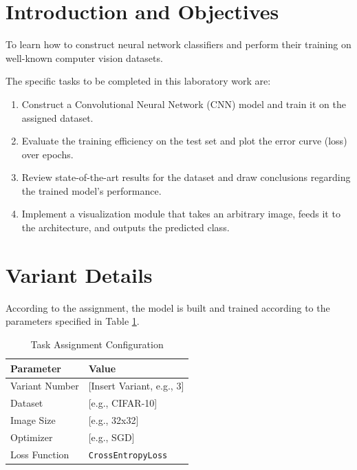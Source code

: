 \documentclass[12pt, a4paper]{article}
\begin{document}
\tableofcontents
\newpage


\section{Introduction and Objectives}

\begin{tcolorbox}[title=Laboratory Goal]
To learn how to construct neural network classifiers and perform their training on well-known computer vision datasets.
\end{tcolorbox}

The specific tasks to be completed in this laboratory work are:
\begin{enumerate}
    \item Construct a Convolutional Neural Network (CNN) model and train it on the assigned dataset. 
    \item Evaluate the training efficiency on the test set and plot the error curve (loss) over epochs.
    \item Review state-of-the-art results for the dataset and draw conclusions regarding the trained model's performance.
    \item Implement a visualization module that takes an arbitrary image, feeds it to the architecture, and outputs the predicted class.
\end{enumerate}

\section{Variant Details}
According to the assignment, the model is built and trained according to the parameters specified in Table \ref{tab:variant}.

\begin{table}[htpb]
    \centering
    \caption{Task Assignment Configuration}
    \label{tab:variant}
    \begin{tabular}{ll}
        \toprule
        \textbf{Parameter} & \textbf{Value} \\
        \midrule
        Variant Number & [Insert Variant, e.g., 3] \\
        Dataset & [e.g., CIFAR-10] \\
        Image Size & [e.g., 32x32] \\
        Optimizer & [e.g., SGD] \\
        Loss Function & \texttt{CrossEntropyLoss} \\
        \bottomrule
    \end{tabular}
\end{table}
\end{document}
